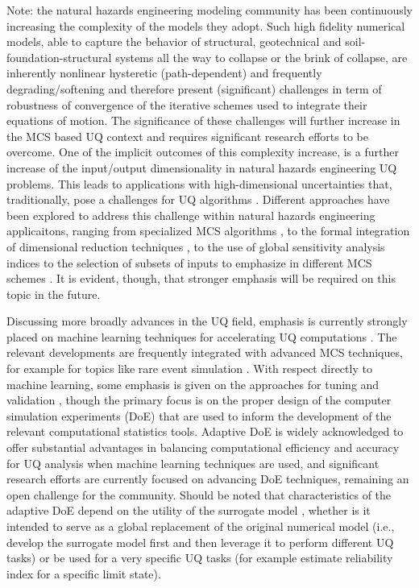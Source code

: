 Note: the natural hazards engineering modeling community has been continuously increasing the complexity of the models they adopt. Such high fidelity numerical models, able to capture the behavior of structural, geotechnical and soil-foundation-structural systems all the way to collapse or the brink of collapse, are inherently nonlinear hysteretic (path-dependent) and frequently degrading/softening and therefore present (significant) challenges in term of robustness of convergence of the iterative schemes used to integrate their equations of motion. The significance of these challenges will further increase in the MCS based UQ context and requires significant research efforts to be overcome. One of the implicit outcomes of this complexity increase, is a further increase of the input/output dimensionality in natural hazards engineering UQ problems. This leads to applications with high-dimensional uncertainties that, traditionally, pose a challenges for UQ algorithms \citep{au2003importance,schueller2004critical}. Different approaches have been explored to address this challenge within natural hazards engineering applicaitons, ranging from specialized MCS algorithms \citep{au2001estimation, wang2016crossentropybased}, to the formal integration of dimensional reduction techniques \citep{jia2013kriging}, to the use of global sensitivity analysis indices to the selection of subsets of inputs to emphasize in different MCS schemes \citep{jia2014adaptive}. It is evident, though, that stronger emphasis will be required on this topic in the future.     

Discussing more broadly advances in the UQ field, emphasis is currently strongly placed on machine learning techniques for accelerating UQ computations \citep{murphy2012machine, ghanem2017handbook, tripathy2018deep}. The relevant developments are frequently integrated with advanced MCS techniques, for example for topics like rare event simulation \citep{li2011efficient,balesdent2013krigingbased,bourinet2016rareevent}. With respect directly to machine learning, some emphasis is given on the approaches for tuning and validation \citep{mehmani2018concurrent}, though the primary focus is on the proper design of the computer simulation experiments (DoE) \citep{kleijnen2008design, picheny2010adaptive, kyprioti2020adaptive} that are used to inform the development of the relevant computational statistics tools. Adaptive DoE is widely acknowledged to offer substantial advantages in balancing computational efficiency and accuracy for UQ analysis when machine learning techniques are used, and significant research efforts are currently focused on advancing DoE techniques, remaining an open challenge for the community. Should be noted that characteristics of the adaptive DoE depend on the utility of the surrogate model \citep{liu2018survey}, whether is it intended to serve as a global replacement of the original numerical model (i.e., develop the surrogate model first and then leverage it to perform different UQ tasks) or be used for a very specific UQ tasks (for example estimate reliability index for a specific limit state). 


